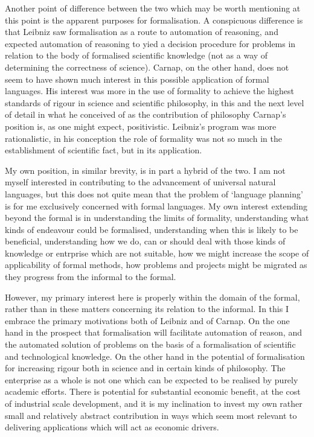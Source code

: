\documentclass[numreferences]{rbjk}
\begin{document}
\begin{article}
Another point of difference between the two which may be worth mentioning at this point is the apparent purposes for formalisation.
A conspicuous difference is that Leibniz saw formalisation as a route to automation of reasoning, and expected automation of reasoning to yied a decision procedure for problems in relation to the body of formalised scientific knowledge (not as a way of determining the correctness of science).
Carnap, on the other hand,  does not seem to have shown much interest in this possible application of formal languages.
His interest was more in the use of formality to achieve the highest standards of rigour in science and scientific philosophy, in this and the next level of detail in what he conceived of as the contribution of philosophy Carnap's position is, as one might expect, positivistic.
Leibniz's program was more rationalistic, in his conception the role of formality was not so much in the establishment of scientific fact, but in its application.

My own position, in similar brevity, is in part a hybrid of the two.
I am not myself interested in contributing to the advancement of universal natural languages, but this does not quite mean that the problem of `language planning' is for me exclusively concerned with formal languages.
My own interest extending beyond the formal is in understanding the limits of formality, understanding what kinds of endeavour could be formalised, understanding when this is likely to be beneficial, understanding how we do, can or should deal with those kinds of knowledge or entrprise which are not suitable, how we might increase the scope of applicability of formal methods, how problems and projects might be migrated as they progress from the informal to the formal.

However, my primary interest here is properly within the domain of the formal, rather than in these matters concerning its relation to the informal.
In this I embrace the primary motivations both of Leibniz and of Carnap.
On the one hand in the prospect that formalisation will facilitate automation of reason, and the automated solution of problems on the basis of a formalisation of scientific and technological knowledge.
On the other hand in the potential of formalisation for increasing rigour both in science and in certain kinds of philosophy.
The enterprise as a whole is not one which can be expected to be realised by purely academic efforts.
There is potential for substantial economic benefit, at the cost of industrial scale development, and it is my inclination to invest my own rather small and relatively abstract contribution in ways which seem most relevant to delivering applications which will act as economic drivers.




%
%


\end{article}
\end{document}
